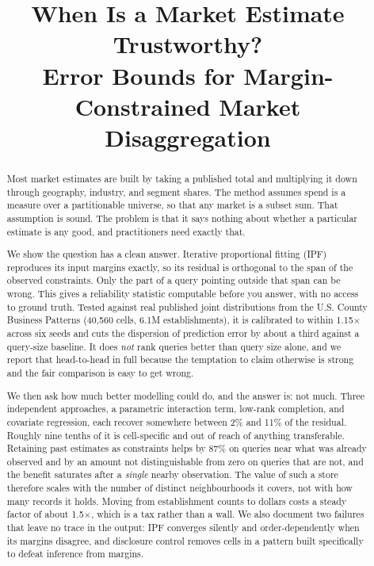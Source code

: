 \documentclass[11pt]{article}
\title{\bf When Is a Market Estimate Trustworthy?\\
\large Error Bounds for Margin-Constrained Market Disaggregation}
\author{}
\date{}
\begin{document}
\maketitle

\begin{abstract}
Most market estimates are built by taking a published total and multiplying it
down through geography, industry, and segment shares. The method assumes spend is
a measure over a partitionable universe, so that any market is a subset sum. That
assumption is sound. The problem is that it says nothing about whether a
particular estimate is any good, and practitioners need exactly that.

We show the question has a clean answer. Iterative proportional fitting (IPF)
reproduces its input margins exactly, so its residual is orthogonal to the span
of the observed constraints. Only the part of a query pointing outside that span
can be wrong. This gives a reliability statistic computable before you answer,
with no access to ground truth. Tested against real published joint
distributions from the U.S. County Business Patterns (40,560 cells, 6.1M
establishments), it is calibrated to within 1.15$\times$ across six seeds and cuts
the dispersion of prediction error by about a third against a query-size
baseline. It does \emph{not} rank queries better than query size alone, and we
report that head-to-head in full because the temptation to claim otherwise is
strong and the fair comparison is easy to get wrong.

We then ask how much better modelling could do, and the answer is: not much.
Three independent approaches, a parametric interaction term, low-rank
completion, and covariate regression, each recover somewhere between 2\% and
11\% of the residual. Roughly nine tenths of it is cell-specific and out of reach
of anything transferable. Retaining past estimates as constraints helps by 87\% on queries near what was
already observed and by an amount not distinguishable from zero on queries that
are not, and the benefit saturates after a \emph{single} nearby observation. The
value of such a store therefore scales with the number of distinct neighbourhoods
it covers, not with how many records it holds. Moving from
establishment counts to dollars costs a steady factor of about 1.5$\times$, which
is a tax rather than a wall. We also document two failures that leave no trace in
the output: IPF converges silently and order-dependently when its margins
disagree, and disclosure control removes cells in a pattern built specifically to
defeat inference from margins.
\end{abstract}
\end{document}
